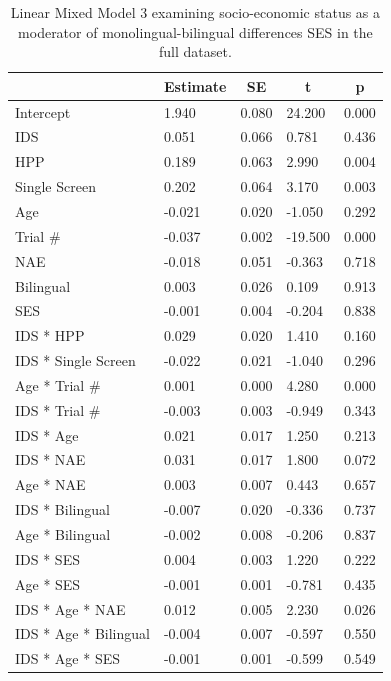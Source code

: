 \documentclass[,man,floatsintext]{apa6}
\begin{document}
\begin{table}[tbp]

\begin{center}
\begin{threeparttable}

\caption{\label{tab:unnamed-chunk-11}Linear Mixed Model 3 examining socio-economic status as a moderator of monolingual-bilingual differences SES in the full dataset.}

\begin{tabular}{lllll}
\toprule
 & \multicolumn{1}{c}{Estimate} & \multicolumn{1}{c}{SE} & \multicolumn{1}{c}{t} & \multicolumn{1}{c}{p}\\
\midrule
Intercept & 1.940 & 0.080 & 24.200 & 0.000\\
IDS & 0.051 & 0.066 & 0.781 & 0.436\\
HPP & 0.189 & 0.063 & 2.990 & 0.004\\
Single Screen & 0.202 & 0.064 & 3.170 & 0.003\\
Age & -0.021 & 0.020 & -1.050 & 0.292\\
Trial \# & -0.037 & 0.002 & -19.500 & 0.000\\
NAE & -0.018 & 0.051 & -0.363 & 0.718\\
Bilingual & 0.003 & 0.026 & 0.109 & 0.913\\
SES & -0.001 & 0.004 & -0.204 & 0.838\\
IDS * HPP & 0.029 & 0.020 & 1.410 & 0.160\\
IDS * Single Screen & -0.022 & 0.021 & -1.040 & 0.296\\
Age * Trial \# & 0.001 & 0.000 & 4.280 & 0.000\\
IDS * Trial \# & -0.003 & 0.003 & -0.949 & 0.343\\
IDS * Age & 0.021 & 0.017 & 1.250 & 0.213\\
IDS * NAE & 0.031 & 0.017 & 1.800 & 0.072\\
Age * NAE & 0.003 & 0.007 & 0.443 & 0.657\\
IDS * Bilingual & -0.007 & 0.020 & -0.336 & 0.737\\
Age * Bilingual & -0.002 & 0.008 & -0.206 & 0.837\\
IDS * SES & 0.004 & 0.003 & 1.220 & 0.222\\
Age * SES & -0.001 & 0.001 & -0.781 & 0.435\\
IDS * Age * NAE & 0.012 & 0.005 & 2.230 & 0.026\\
IDS * Age * Bilingual & -0.004 & 0.007 & -0.597 & 0.550\\
IDS * Age * SES & -0.001 & 0.001 & -0.599 & 0.549\\
\bottomrule
\end{tabular}

\end{threeparttable}
\end{center}

\end{table}
\end{document}
